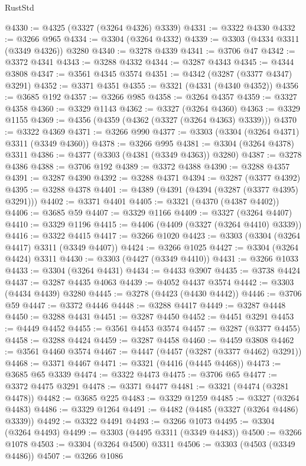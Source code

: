 \begin{lexlean}{RustStd}
\begin{coremodule}
{\begin{coremodule}
{{{{{{{{{{{{{{{{{{{{{{{{{{{{{{{{{@4330 := @4325 (@3327 (@3264 @4326) @3339)
@4331 := @3322 @4330
@4332 := @3266 @965
@4334 := @3304 (@3264 @4332)
@4339 := @3303 (@4334 @3311 (@3349 @4326)) @3280
@4340 := @3278 @4339
@4341 := @3706 @47
@4342 := @3372 @4341
@4343 := @3288 @4332
@4344 := @3287 @4343
@4345 := @4344 @3808
@4347 := @3561 @4345 @3574
@4351 := @4342 (@3287 (@3377 @4347) @3291)
@4352 := @3371 @4351
@4355 := @3321 (@4331 (@4340 @4352))
@4356 := @3685 @192
@4357 := @3266 @985
@4358 := @3264 @4357
@4359 := @3327 @4358
@4360 := @3329 @1143
@4362 := @3327 (@3264 @4360)
@4363 := @3329 @1155
@4369 := @4356 (@4359 (@4362 (@3327 (@3264 @4363) @3339)))
@4370 := @3322 @4369
@4371 := @3266 @990
@4377 := @3303 (@3304 (@3264 @4371) @3311 (@3349 @4360))
@4378 := @3266 @995
@4381 := @3304 (@3264 @4378) @3311
@4386 := @4377 (@3303 (@4381 (@3349 @4363)) @3280)
@4387 := @3278 @4386
@4388 := @3706 @192
@4389 := @3372 @4388
@4390 := @3288 @4357
@4391 := @3287 @4390
@4392 := @3288 @4371
@4394 := @3287 (@3377 @4392)
@4395 := @3288 @4378
@4401 := @4389 (@4391 (@4394 (@3287 (@3377 @4395) @3291)))
@4402 := @3371 @4401
@4405 := @3321 (@4370 (@4387 @4402))
@4406 := @3685 @59
@4407 := @3329 @1166
@4409 := @3327 (@3264 @4407)
@4410 := @3329 @1196
@4415 := @4406 (@4409 (@3327 (@3264 @4410) @3339))
@4416 := @3322 @4415
@4417 := @3266 @1020
@4423 := @3303 (@3304 (@3264 @4417) @3311 (@3349 @4407))
@4424 := @3266 @1025
@4427 := @3304 (@3264 @4424) @3311
@4430 := @3303 (@4427 (@3349 @4410))
@4431 := @3266 @1033
@4433 := @3304 (@3264 @4431)
@4434 := @4433 @3907
@4435 := @3738 @4424
@4437 := @3287 @4435 @4063
@4439 := @4052 @4437 @3574
@4442 := @3303 (@4434 @4439) @3280
@4445 := @3278 (@4423 (@4430 @4442))
@4446 := @3706 @59
@4447 := @3372 @4446
@4448 := @3288 @4417
@4449 := @3287 @4448
@4450 := @3288 @4431
@4451 := @3287 @4450
@4452 := @4451 @3291
@4453 := @4449 @4452
@4455 := @3561 @4453 @3574
@4457 := @3287 (@3377 @4455)
@4458 := @3288 @4424
@4459 := @3287 @4458
@4460 := @4459 @3808
@4462 := @3561 @4460 @3574
@4467 := @4447 (@4457 (@3287 (@3377 @4462) @3291))
@4468 := @3371 @4467
@4471 := @3321 (@4416 (@4445 @4468))
@4473 := @3685 @65 @3339
@4474 := @3322 @4473
@4475 := @3706 @65
@4477 := @3372 @4475 @3291
@4478 := @3371 @4477
@4481 := @3321 (@4474 (@3281 @4478))
@4482 := @3685 @225
@4483 := @3329 @1259
@4485 := @3327 (@3264 @4483)
@4486 := @3329 @1264
@4491 := @4482 (@4485 (@3327 (@3264 @4486) @3339))
@4492 := @3322 @4491
@4493 := @3266 @1073
@4495 := @3304 (@3264 @4493)
@4499 := @3303 (@4495 @3311 (@3349 @4483))
@4500 := @3266 @1078
@4503 := @3304 (@3264 @4500) @3311
@4506 := @3303 (@4503 (@3349 @4486))
@4507 := @3266 @1086
}}}}}}}}}}}}}}}}}}}}}}}}}}}}}}}}}
\end{coremodule}}
\end{coremodule}
\end{lexlean}
